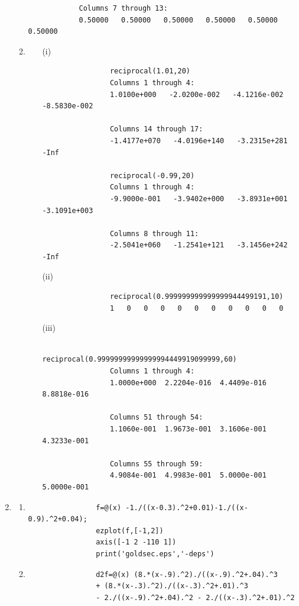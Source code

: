 \documentclass[11pt,a4paper]{article}
\begin{document}
\begin{enumerate}
\begin{enumerate}
\begin{verbatim}
			Columns 7 through 13:
			0.50000   0.50000   0.50000   0.50000   0.50000   0.50000 
		\end{verbatim}
		
		\item
		\begin{enumerate}
		
			\item[(i)]
			\begin{verbatim}
				reciprocal(1.01,20)
				Columns 1 through 4:
				1.0100e+000   -2.0200e-002   -4.1216e-002   -8.5830e-002  
					
				Columns 14 through 17:
				-1.4177e+070   -4.0196e+140   -3.2315e+281   -Inf
					
				reciprocal(-0.99,20)
				Columns 1 through 4:
				-9.9000e-001   -3.9402e+000   -3.8931e+001   -3.1091e+003
					
				Columns 8 through 11:
				-2.5041e+060   -1.2541e+121   -3.1456e+242    -Inf
				\end{verbatim}
				
			\item[(ii)]
			\begin{verbatim}
				reciprocal(0.999999999999999944499191,10)
				1   0   0   0   0   0   0   0   0   0   0
			\end{verbatim}
			
			\pagebreak
			
			\item[(iii)]
			\begin{verbatim}
				reciprocal(0.99999999999999994449919099999,60)
				Columns 1 through 4:
				1.0000e+000  2.2204e-016  4.4409e-016  8.8818e-016
				
				Columns 51 through 54:
				1.1060e-001  1.9673e-001  3.1606e-001  4.3233e-001   

				Columns 55 through 59:
				4.9084e-001  4.9983e-001  5.0000e-001  5.0000e-001
			\end{verbatim}
		\end{enumerate}
	\end{enumerate}
	
	\item
	\begin{enumerate}
		\item
			\begin{verbatim}
				f=@(x) -1./((x-0.3).^2+0.01)-1./((x-0.9).^2+0.04);
				ezplot(f,[-1,2])
				axis([-1 2 -110 1])
				print('goldsec.eps','-deps')
			\end{verbatim}
		\item
			\begin{verbatim}
				d2f=@(x) (8.*(x-.9).^2)./((x-.9).^2+.04).^3 
				+ (8.*(x-.3).^2)./((x-.3).^2+.01).^3 
				- 2./((x-.9).^2+.04).^2 - 2./((x-.3).^2+.01).^2
				

\end{verbatim}
\end{enumerate}
\end{enumerate}
\end{document}
